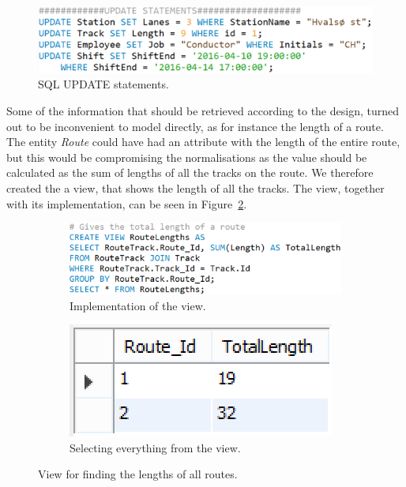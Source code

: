 \begin{figure}[ht!]
    \centering
    \includegraphics[scale=.5]{img/UPDATE_Statements}
    \caption{SQL UPDATE statements.}
    \label{fig:update}
\end{figure}

Some of the information that should be retrieved according to the design, 
turned out to be inconvenient to model directly, as for instance the length 
of a route. The entity \emph{Route} could have had an attribute with the length 
of the entire route, but this would be compromising the normalisations as the 
value should be calculated as the sum of lengths of all the tracks on the 
route. We therefore created the a view, that shows the length of all the 
tracks. The view, together with its implementation, can be seen in 
Figure~\ref{fig:length}.

\begin{figure}[h]
    \centering
    \begin{subfigure}[b]{0.45 \textwidth}
        \centering
        \includegraphics[width=\textwidth]{img/RouteLengths}
        \caption{Implementation of the view.}
    \end{subfigure}
    \begin{subfigure}[b]{0.45 \textwidth}
        \centering
        \includegraphics{img/RouteLengthsView}
        \caption{Selecting everything from the view.}
    \end{subfigure}
    \caption{View for finding the lengths of all routes.}
    \label{fig:length}
\end{figure}

